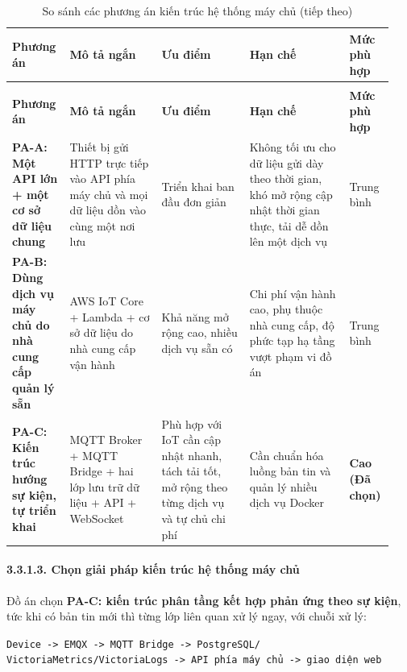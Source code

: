 \documentclass[a4paper]{extarticle}
\newcommand{\thesissettableid}[2]{%
  \renewcommand{\thetable}{#1}%
  \renewcommand{\theHtable}{#2}%
}
\begin{document}
{\thesissettableid{3.15A}{tab-ch3-so-sanh-cac-phuong-an-kien-truc-cloud}
\def\LTcaptype{table}
\begin{longtable}{|L{0.145\linewidth}|L{0.230\linewidth}|L{0.220\linewidth}|L{0.250\linewidth}|L{0.100\linewidth}|}
\caption{So sánh các phương án kiến trúc hệ thống máy chủ}\label{tab:ch3-so-sanh-cac-phuong-an-kien-truc-cloud}\\
\hline \textbf{Phương án} & \textbf{Mô tả ngắn} & \textbf{Ưu điểm} & \textbf{Hạn chế} & \textbf{Mức phù hợp} \\
\hline
\endfirsthead
\caption[]{So sánh các phương án kiến trúc hệ thống máy chủ (tiếp theo)}\\
\hline \textbf{Phương án} & \textbf{Mô tả ngắn} & \textbf{Ưu điểm} & \textbf{Hạn chế} & \textbf{Mức phù hợp} \\
\hline
\endhead
\hline
\endfoot
\endlastfoot
\textbf{PA-A: Một API lớn + một cơ sở dữ liệu chung} & Thiết bị gửi HTTP
trực tiếp vào API phía máy chủ và mọi dữ liệu dồn vào cùng một nơi lưu &
Triển khai ban đầu đơn giản & Không tối ưu cho dữ liệu gửi dày theo thời
gian, khó mở rộng cập nhật thời gian thực, tải dễ dồn lên một dịch vụ &
Trung bình \\\hline
\textbf{PA-B: Dùng dịch vụ máy chủ do nhà cung cấp quản lý sẵn} & AWS IoT
Core + Lambda + cơ sở dữ liệu do nhà cung cấp vận hành & Khả năng mở
rộng cao, nhiều dịch vụ sẵn có & Chi phí vận hành cao, phụ thuộc nhà
cung cấp, độ phức tạp hạ tầng vượt phạm vi đồ án & Trung bình \\\hline
\textbf{PA-C: Kiến trúc hướng sự kiện, tự triển khai} & MQTT Broker +
MQTT Bridge + hai lớp lưu trữ dữ liệu + API + WebSocket & Phù hợp với
IoT cần cập nhật nhanh, tách tải tốt, mở rộng theo từng dịch vụ và tự
chủ chi phí & Cần chuẩn hóa luồng bản tin và quản lý nhiều dịch vụ Docker &
\textbf{Cao (Đã chọn)} \\\hline
\end{longtable}
}


\paragraph{3.3.1.3. Chọn giải pháp kiến trúc
hệ thống máy chủ}\label{3133-chux1ecdn-giux1ea3i-phuxe1p-kiux1ebfn-truxfac-cloud}

Đồ án chọn \textbf{PA-C: kiến trúc phân tầng kết hợp phản ứng theo sự kiện},
tức khi có bản tin mới thì từng lớp liên quan xử lý ngay, với chuỗi xử lý:

\texttt{Device\ -\textgreater{}\ EMQX\ -\textgreater{}\ MQTT\ Bridge\ -\textgreater{}\ PostgreSQL/}\\
\texttt{VictoriaMetrics/VictoriaLogs\ -\textgreater{}\ API\ phía\ máy\ chủ\ -\textgreater{}\ giao\ diện\ web}
\end{document}
